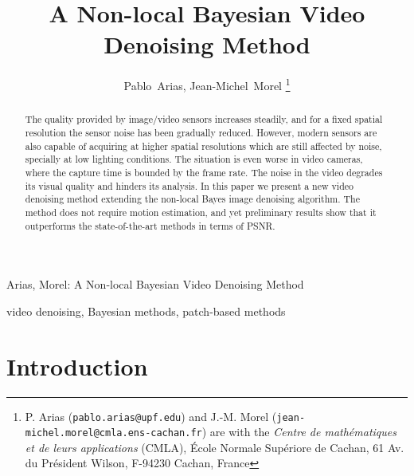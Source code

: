\documentclass[10pt, journal, twocolumn, final, a4paper]{IEEEtran}
\begin{document}
\title{A Non-local Bayesian Video Denoising Method}

\author{Pablo~Arias, Jean-Michel~Morel%
\thanks{P. Arias (\texttt{pablo.arias@upf.edu}) and J.-M. Morel
(\texttt{jean-michel.morel@cmla.ens-cachan.fr}) are with the \emph{Centre de
math\'ematiques et de leurs applications} (CMLA), \'Ecole Normale Sup\'eriore
de Cachan, 61 Av. du Pr\'esident Wilson, F-94230 Cachan, France}}

%
{Arias, Morel: A Non-local Bayesian Video Denoising Method}


\maketitle              %

\begin{abstract}
	The quality provided by image/video sensors increases steadily, and
	for a fixed spatial resolution the sensor noise has been gradually reduced.
	However, modern sensors are also capable of acquiring at higher spatial
	resolutions which are still affected by noise, specially at low lighting
	conditions. The situation is even worse in video cameras, where the capture
	time is bounded by the frame rate. The noise in the video degrades its visual 
	quality and hinders its analysis.
	In this paper we present a new video denoising method extending 
	the non-local Bayes image denoising algorithm. The method does not require 
	motion estimation, and yet preliminary results show that it outperforms the
	state-of-the-art methods in terms of PSNR.
\end{abstract}

\begin{IEEEkeywords}
	video denoising, Bayesian methods, patch-based methods
\end{IEEEkeywords}


%
\IEEEpeerreviewmaketitle

%
\section{Introduction}
%
\end{document}
